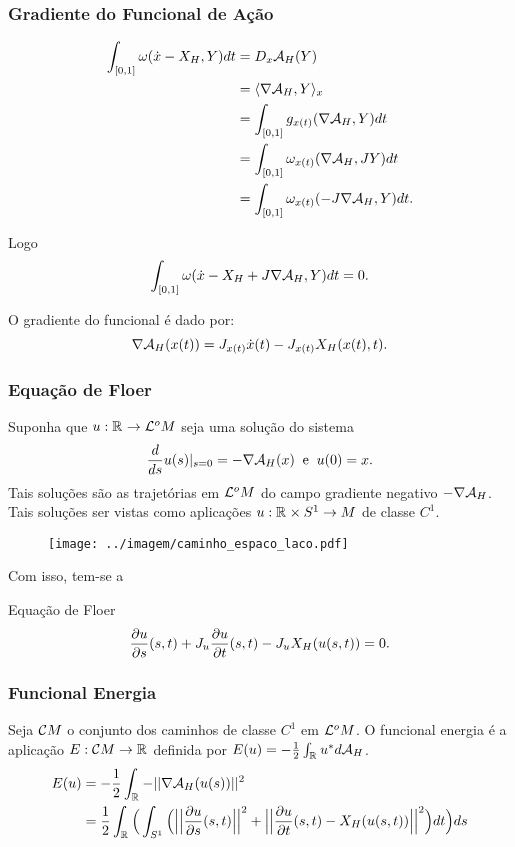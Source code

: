 \documentclass{beamer}
\begin{document}
\begin{footnotesize}
\begin{frame}
	\end{frame}
	
	\begin{frame}
		\frametitle{Gradiente do Funcional de Ação}
		$$
		\begin{aligned}
		\int_{[0,1]} \omega(\dot{x} - X_{H}, Y)dt&=
		D_{x}\mathcal{A}_{H}(Y)
		\\ 
		&= \langle \nabla \mathcal{A}_{H}, Y \rangle_{x}
		\\
		&= \int_{[0,1]}g_{x(t)}(\nabla \mathcal{A}_{H}, Y)dt
		\\
		&=\int_{[0,1]} \omega_{x(t)}(\nabla \mathcal{A}_{H}, JY)dt
		\\
		&=\int_{[0,1]} \omega_{x(t)}(-J\nabla \mathcal{A}_{H}, Y)dt.
		\end{aligned}
		$$
				
			
		Logo
		$$
		\int_{[0,1]} \omega(\dot{x} - X_{H} + J\nabla \mathcal{A}_{H}, Y)dt = 0.
		$$
		\begin{block}{O gradiente do funcional é dado por:}
			$$
			\nabla \mathcal{A}_{H}(x(t))= J_{x(t)}\dot{x}(t)-J_{x(t)}X_{H}(x(t), t).
			$$
		\end{block}
		
	\end{frame}
	
	\begin{frame}
		\frametitle{Equação de Floer}
		Suponha que $u :\mathbb{R}^{}\to \mathcal{L}^{o}M$ seja uma solução do sistema 
	$$
	\frac{d }{d s}u(s)|_{s=0} = -\nabla \mathcal{A}_{H}(x) \;\;\text{e}\;\;u(0)=x.
	$$
	Tais soluções são as trajetórias em $\mathcal{L}^{o}M$ do campo gradiente negativo $-\nabla \mathcal{A}_{H}$. Tais soluções ser vistas como aplicações $u:\mathbb{R}^{} \times S^{1} \to M$ de classe $C^{1}$.
	\begin{figure}[!h]
		\centering
		\texttt{[image: ../imagem/caminho\_espaco\_laco.pdf]}
	\end{figure} 
		
		Com isso, tem-se a
		\begin{block}{Equação de Floer}
			$$
			\frac{\partial u}{\partial s}(s,t) + J_{u}\frac{\partial u}{\partial t}(s,t) - J_{u}X_{H}(u(s,t))=0.
			$$
		\end{block}
	\end{frame}
	
	\begin{frame}
		\frametitle{Funcional Energia}
		
		Seja $\mathcal{C}M$ o conjunto dos caminhos de classe $C^{1}$ em $\mathcal{L}^{o}M$. O funcional energia é a aplicação $E: \mathcal{C}M \to \mathbb{R}^{}$ definida por $E(u)
		=-\frac{1}{2}\int_{\mathbb{R}^{}}u^{*}d\mathcal{A}_{H}$.
		$$
		\begin{aligned}
			E(u) &= -\frac{1}{2}\int_{\mathbb{R}^{}}-||\nabla \mathcal{A}_{H}(u(s))||^{2}
			\\
			&= \frac{1}{2}\int_{\mathbb{R}^{}}\Big(  \int_{S^{1}} \Big( \Big|\Big|\frac{\partial u}{\partial s}(s,t)\Big|\Big|^{2} + \Big|\Big|\frac{\partial u}{\partial t}(s,t) - X_{H}(u(s,t))\Big|\Big|^{2} \Big) dt  \Big)ds
		\end{aligned}
		$$
		

\end{frame}
\end{footnotesize}
\end{document}
